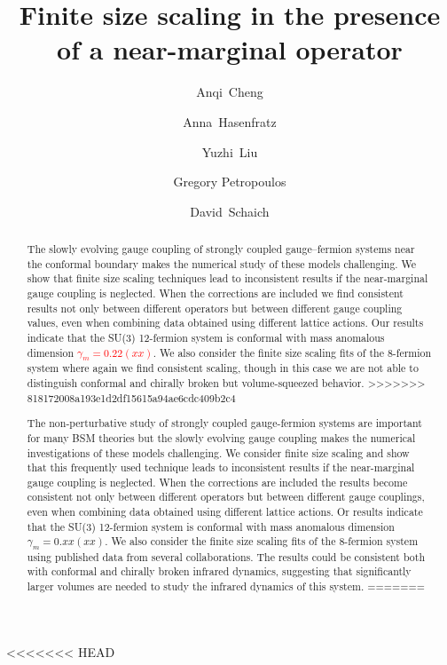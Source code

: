 \documentclass[prl, letterpaper, amsmath, amssymb, preprintnumbers, showpacs, superscriptaddress, twocolumn]{revtex4-1}
\newcommand{\ga}{\ensuremath{\gamma} }
\newcommand{\TODO}[1]{\textcolor{red}{{\bf #1}}}
\begin{document}
\title{Finite size scaling in the presence of a near-marginal operator}

\author{Anqi~Cheng}
\author{Anna~Hasenfratz}
\author{Yuzhi~Liu}
\author{Gregory Petropoulos}
\author{David~Schaich}

<<<<<<< HEAD
\begin{abstract}
The non-perturbative study of strongly coupled gauge-fermion systems  are important for many BSM theories  but the  slowly evolving gauge coupling  makes the numerical investigations of these models challenging. We consider finite size scaling and show that this  frequently used technique leads to inconsistent results if the near-marginal gauge coupling is neglected. When the corrections are included the results become consistent not only between different operators but between different gauge couplings, even when combining data obtained using different lattice actions. Or results indicate that the SU(3) 12-fermion system is conformal with mass anomalous dimension $\gamma_m=0.xx(xx)$. We also consider the finite size scaling fits of the 8-fermion system using published data from several collaborations. The results could be consistent both with conformal and chirally broken infrared dynamics, suggesting  that significantly larger volumes are needed to study the infrared dynamics of this system. 
=======
\begin{abstract} %
The slowly evolving gauge coupling of strongly coupled gauge--fermion systems near the conformal boundary makes the numerical study of these models challenging. We show that finite size scaling techniques lead to inconsistent results if the near-marginal gauge coupling is neglected. When the corrections are included we find consistent results not only between different operators but between different gauge coupling values, even when combining data obtained using different lattice actions. Our results indicate that the SU(3) 12-fermion system is conformal with mass anomalous dimension \TODO{$\ga_m = 0.22(xx)$}. We also consider the finite size scaling fits of the 8-fermion system where again we find consistent scaling, though in this case we are not able to distinguish conformal and chirally broken but volume-squeezed behavior.
>>>>>>> 818172008a193e1d2df15615a94ae6cdc409b2c4
\end{abstract}


\end{abstract}
\end{document}
